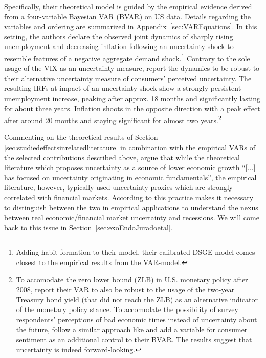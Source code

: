 \documentclass[a4paper,11pt,listof=nochaptergap,oneside,pointednumbers,bibtotoc,bigheadings,liststotoc,hidelinks]{scrbook}
\theoremstyle{mysatz}
\theoremstyle{mydefinition}
\theoremstyle{mytheorem}
\theoremstyle{mybemerkung}
\begin{document}
Specifically, their theoretical model is guided by the empirical evidence derived from a four-variable Bayesian VAR (BVAR) on US data. Details regarding the variables and ordering are summarized in Appendix~\ref{sec:VAREquations}. In this setting, the authors declare the observed joint dynamics of sharply rising unemployment and decreasing inflation following an uncertainty shock to resemble features of a negative aggregate demand shock.\footnote{Adding habit formation to their model, their calibrated DSGE model comes closest to the empirical results from the VAR-model.} Contrary to the sole usage of the VIX as an uncertainty measure, \citet{leducandliu:16} report the dynamics to be robust to their alternative uncertainty measure of consumers' perceived uncertainty. The resulting IRFs at impact of an uncertainty shock show a strongly persistent unemployment increase, peaking after approx. 18 months and significantly lasting for about three years. Inflation shoots in the opposite direction with a peak effect after around 20 months and staying significant for almost two years.\footnote{To accomodate the zero lower bound (ZLB) in U.S. monetary policy after 2008, \citet{leducandliu:16} report their VAR to also be robust to the usage of the two-year Treasury bond yield (that did not reach the ZLB) as an alternative indicator of the monetary policy stance. To accomodate the possibility of survey respondents' perceptions of bad economic times instead of uncertainty about the future, \citet{leducandliu:16} follow a similar approach like \citet{bakeretal:15} and add a variable for consumer sentiment as an additional control to their BVAR. The results suggest that uncertainty is indeed forward-looking.}

Commenting on the theoretical results of Section \ref{sec:studiedeffectsinrelatedliterature} in combination with the empirical VARs of the selected contributions described above, \citet[p. 4]{ludvigsonetal:19} argue that while the theoretical literature which proposes uncertainty as a source of lower economic growth ``[...] has focused on uncertainty originating in economic fundamentals'', the empirical literature, however, typically used uncertainty proxies which are strongly correlated with financial markets. According to \citet{ludvigsonetal:18} this practice makes it necessary to distinguish between the two in empirical applications to understand the nexus between real economic/financial market uncertainty and recessions. We will come back to this issue in Section~\ref{sec:exoEndoJuradoetal}.
\end{document}

